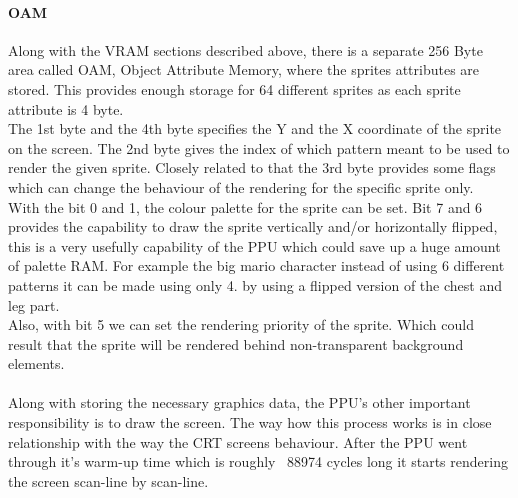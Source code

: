 \documentclass[]{report}
\begin{document}
\paragraph{OAM }
Along with the VRAM sections described above, there is a separate 256 Byte area called OAM, Object Attribute Memory, where the sprites attributes are stored. This provides enough storage for 64 different sprites as each sprite attribute is 4 byte. 
\\
The 1st byte and the 4th byte specifies the Y and the X coordinate of the sprite on the screen. The 2nd byte gives the index of which pattern meant to be used to render the given sprite. Closely related to that the 3rd byte provides some flags which can change the behaviour of the rendering for the specific sprite only. 
\\
With the bit 0 and 1, the colour palette for the sprite can be set. Bit 7 and 6 provides the capability to draw the sprite vertically and/or horizontally flipped, this is a very usefully capability of the PPU which could save up a huge amount of palette RAM. For example the big mario character instead of using 6 different patterns it can be made using only 4. by using a flipped version of the chest and leg part.
\\
Also, with bit 5 we can set the rendering priority of the sprite. Which could result that the sprite will be rendered behind non-transparent background elements.

\paragraph{ }
Along with storing the necessary graphics data, the PPU's other important responsibility is to draw the screen. The way how this process works is in close relationship with the way the CRT screens behaviour.
After the PPU went through it's warm-up time which is roughly ~88974 cycles long it starts rendering the screen scan-line by scan-line.  
\end{document}
